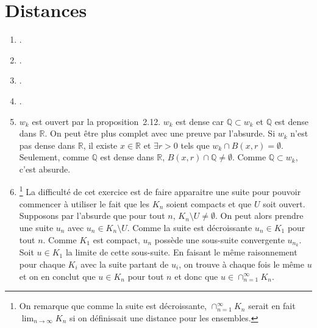 \section{Distances}
\begin{enumerate}
  \item {}.   %
  \item {}.   %
  \item {}.  %
  \item {}. %
  \item $w_k$ est ouvert par la proposition~2.12.
    $w_k$ est dense car $\mathbb{Q} \subset w_k$ et $\mathbb{Q}$ est dense dans $\mathbb{R}$.
    On peut être plus complet avec une preuve par l'absurde.
    Si $w_k$ n'est pas dense dans $\mathbb{R}$,
    il existe $x \in \mathbb{R}$ et $\exists r > 0$ tels que
    $w_k \cap B(x,r) = \emptyset$.
    Seulement, comme $\mathbb{Q}$ est dense dans $\mathbb{R}$, $B(x,r) \cap \mathbb{Q} \neq \emptyset$.
    Comme $\mathbb{Q} \subset w_k$, c'est absurde.
  \item \label{ex:unicompact}
    \footnote{On remarque que comme la suite est décroissante, $\cap_{n=1}^\infty K_n$ serait en fait $\lim_{n\to\infty} K_n$
    si on définissait une distance pour les ensembles.}
    La difficulté de cet exercice est de faire apparaitre une suite pour pouvoir commencer à utiliser
    le fait que les $K_n$ soient compacts et que $U$ soit ouvert.
    Supposons par l'absurde que pour tout $n$, $K_n \setminus U \neq \emptyset$.
    On peut alors prendre une suite $u_n$ avec $u_n \in K_n \setminus U$.
    Comme la suite est décroissante $u_n \in K_1$ pour tout $n$.
    Comme $K_1$ est compact, $u_n$ possède une sous-suite convergente $u_{n_k}$.
    Soit $u \in K_1$ la limite de cette sous-suite.
    En faisant le même raisonnement pour chaque $K_i$ avec la suite partant de $u_i$,
    on trouve à chaque fois le même $u$ et on en conclut que $u \in K_n$ pour tout $n$
    et donc que $u \in \cap_{n=1}^\infty K_n$.


\end{enumerate}
